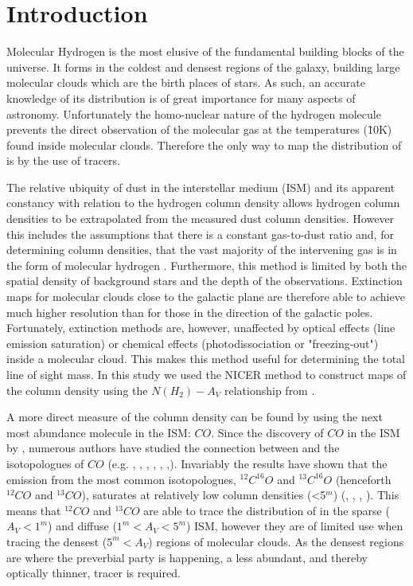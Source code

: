 \documentclass{aa}
\begin{document}
\section{Introduction}
Molecular Hydrogen is the most elusive of the fundamental building blocks of the universe. It forms in the coldest and densest regions of the galaxy, building large molecular clouds which are the birth places of stars. As such, an accurate knowledge of its distribution is of great importance for many aspects of astronomy. Unfortunately the homo-nuclear nature of the hydrogen molecule prevents the direct observation of the molecular gas at the temperatures (\~10K) found inside molecular clouds. Therefore the only way to map the distribution of \htwo is by the use of tracers. 

The relative ubiquity of dust in the interstellar medium (ISM) and its apparent constancy with relation to the hydrogen column density \citep{bohlin78} allows hydrogen column densities to be extrapolated from the measured dust column densities. However this includes the assumptions that there is a constant gas-to-dust ratio and, for determining \htwo column densities, that the vast majority of the intervening gas is in the form of molecular hydrogen \citet{bohlin78}. Furthermore, this method is limited by both the spatial density of background stars and the depth of the observations. Extinction maps for molecular clouds close to the galactic plane are therefore able to achieve much higher resolution than for those in the direction of the galactic poles. Fortunately, extinction methods are, however, unaffected by optical effects (line emission saturation) or chemical effects (photodissociation or "freezing-out") inside a molecular cloud. This makes this method useful for determining the total line of sight \htwo mass. In this study we used the NICER method\citep{nicer} to construct maps of the \htwo column density using the $N(H_2)-A_V$ relationship from \citet{bohlin78}.

A more direct measure of the \htwo column density can be found by using the next most abundance molecule in the ISM: $CO$. Since the discovery of $CO$ in the ISM by \citet{wilson70}, numerous authors have studied the connection between \htwo and the isotopologues of $CO$ (e.g. \citealt{dickman78}, \citealt{frerking82}, \citealt{duvert86}, \citealt{lada94}, \citealt{alves99}, \citealt{kainulainen06},\citealt{pineda10}). Invariably the results have shown that the emission from the most common isotopologues, $^{12}C^{16}O$ and $^{13}C^{16}O$ (henceforth $^{12}CO$ and $^{13}CO$), saturates at relatively low \htwo column densities (\av<5$^m$) (\citealt{frerking82}, \citealt{lada94}, \citealt{hayakawa01}, \citealt{pineda08}). This means that $^{12}CO$ and $^{13}CO$ are able to trace the distribution of \htwo in the sparse ($A_V<1^m$) and diffuse ($1^m<A_V<5^m$) ISM, however they are of limited use when tracing the densest ($5^m<A_V$) regions of molecular clouds. As the densest regions are where the preverbial party is happening, a less abundant, and thereby optically thinner, tracer is required.
\end{document}
